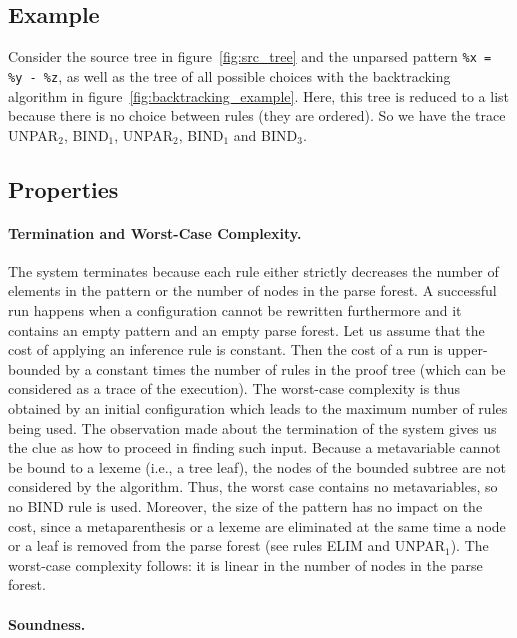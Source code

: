 \subsection{Example}

Consider the source tree in figure~\ref{fig:src_tree} and the unparsed
pattern \texttt{\%x = \%y - \%z}, as well as the tree of all possible
choices with the backtracking algorithm in
figure~\ref{fig:backtracking_example}. Here, this tree is reduced to a
list because there is no choice between rules (they are ordered). So
we have the trace \textsf{UNPAR}\(_2\), \textsf{BIND}\(_1\),
\textsf{UNPAR}\(_2\), \textsf{BIND}\(_1\) and \textsf{BIND}\(_3\).

\subsection{Properties}

\paragraph{Termination and Worst\hyp{}Case Complexity.} The system
terminates because each rule either strictly decreases the number of
elements in the pattern or the number of nodes in the parse forest. A
successful run happens when a configuration cannot be rewritten
furthermore and it contains an empty pattern and an empty parse
forest. Let us assume that the cost of applying an inference rule is
constant. Then the cost of a run is upper\hyp{}bounded by a constant
times the number of rules in the proof tree (which can be considered
as a trace of the execution). The worst\hyp{}case complexity is thus
obtained by an initial configuration which leads to the maximum number
of rules being used. The observation made about the termination of the
system gives us the clue as how to proceed in finding such
input. Because a meta\-variable cannot be bound to a lexeme (i.e., a
tree leaf), the nodes of the bounded subtree are not considered by the
algorithm. Thus, the worst case contains no meta\-variables, so no
\textsf{BIND} rule is used. Moreover, the size of the pattern has no
impact on the cost, since a meta\-parenthesis or a lexeme are
eliminated at the same time a node or a leaf is removed from the parse
forest (see rules \textsf{ELIM} and \textsf{UNPAR}\(_1\)). The
worst\hyp{}case complexity follows: it is linear in the number of
nodes in the parse forest.

\paragraph{Soundness.}


